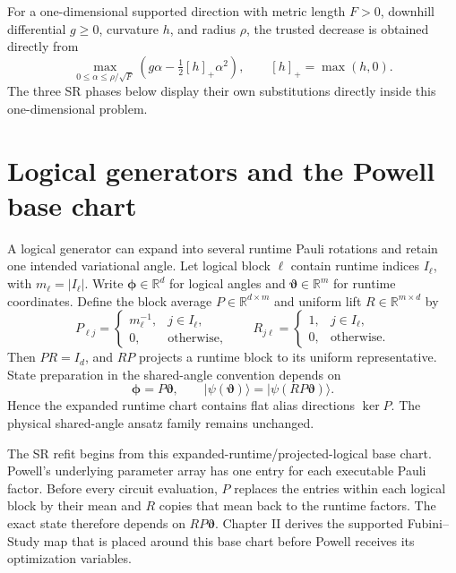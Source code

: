 \documentclass[10pt,twocolumn]{article}
\newcommand{\ket}[1]{\lvert #1\rangle}
\begin{document}
For a one-dimensional supported direction with metric length \(F>0\),
downhill differential \(g\geq0\), curvature \(h\), and radius \(\rho\),
the trusted decrease is obtained directly from
\begin{equation}
\max_{0\leq\alpha\leq\rho/\sqrt F}
\left(g\alpha-\tfrac12[h]_+\alpha^2\right),
\qquad [h]_+=\max(h,0).
\label{eq:scalar-trust-response}
\end{equation}
The three SR phases below display their own substitutions directly inside this
one-dimensional problem.

\section*{Logical generators and the Powell base chart}

A logical generator can expand into several runtime Pauli rotations and retain
one intended variational angle. Let logical block \(\ell\) contain
runtime indices \(I_\ell\), with \(m_\ell=|I_\ell|\). Write
\(\bm\phi\in\mathbb R^d\) for logical angles and
\(\bm\vartheta\in\mathbb R^m\) for runtime coordinates. Define the block
average \(P\in\mathbb R^{d\times m}\) and uniform lift
\(R\in\mathbb R^{m\times d}\) by
\begin{equation}
P_{\ell j}=\begin{cases}m_\ell^{-1},&j\in I_\ell,\\0,&\text{otherwise},\end{cases}
\qquad
R_{j\ell}=\begin{cases}1,&j\in I_\ell,\\0,&\text{otherwise}.
\end{cases}
\label{eq:logical-runtime-maps}
\end{equation}
Then \(PR=I_d\), and \(RP\) projects a runtime block to its uniform
representative. State preparation in the shared-angle convention depends on
\begin{equation}
\bm\phi=P\bm\vartheta,\qquad
\ket{\psi(\bm\vartheta)}=\ket{\psi(RP\bm\vartheta)}.
\label{eq:runtime-projection}
\end{equation}
Hence the expanded runtime chart contains flat alias directions
\(\ker P\). The physical shared-angle ansatz family remains unchanged.

The SR refit begins from this expanded-runtime/projected-logical base chart.
Powell's underlying parameter array has one entry for each executable Pauli
factor. Before every circuit evaluation, \(P\) replaces the entries within
each logical block by their mean and \(R\) copies that mean back to the
runtime factors. The exact state therefore depends on
\(RP\bm\vartheta\). Chapter II derives the supported Fubini--Study map that is
placed around this base chart before Powell receives its optimization
variables.
\end{document}
